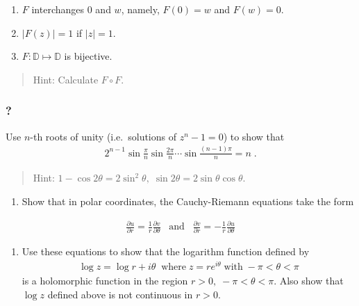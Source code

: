 \begin{enumerate}
\def\labelenumi{(\roman{enumi})}
\setcounter{enumi}{1}
\item
  \(F\) interchanges \(0\) and \(w\), namely, \(F(0) = w\) and
  \(F(w) = 0\).
\item
  \(|F(z)| = 1\) if \(|z| = 1\).
\item
  \(F: {\mathbb D} \mapsto {\mathbb D}\) is bijective.
\end{enumerate}

\begin{quote}
Hint: Calculate \(F \circ F\).
\end{quote}

\hypertarget{section-136}{%
\subsubsection{?}\label{section-136}}

Use \(n\)-th roots of unity (i.e.~solutions of \(z^n - 1 =0\)) to show
that
\begin{align*}2^{n-1} \sin\frac{\pi}{n} \sin\frac{2\pi}{n} \cdots \sin\frac{(n-1)\pi}{n}
= n
\; .\end{align*}

\begin{quote}
Hint:
\(1 - \cos 2 \theta = 2 \sin^2 \theta,\; \sin 2 \theta = 2 \sin \theta \cos \theta\).
\end{quote}

\begin{enumerate}
\def\labelenumi{(\alph{enumi})}
\tightlist
\item
  Show that in polar coordinates, the Cauchy-Riemann equations take the
  form
\end{enumerate}

\begin{align*}\frac{\partial u}{\partial r} = \frac{1}{r} \frac{\partial v}{\partial \theta}
\; \; \; \text{and} \; \; \;
\frac{\partial v}{\partial r} = - \frac{1}{r} \frac{\partial u}{\partial \theta}\end{align*}

\begin{enumerate}
\def\labelenumi{(\alph{enumi})}
\setcounter{enumi}{1}
\tightlist
\item
  Use these equations to show that the logarithm function defined by
  \begin{align*}\log z = \log r + i \theta \; \;
  \mbox{where} \; z = r e^{i \theta } \; \mbox{with} \; - \pi < \theta < \pi\end{align*}
  is a holomorphic function in the region
  \(r>0, \; - \pi < \theta < \pi\). Also show that \(\log z\) defined
  above is not continuous in \(r>0\).
\end{enumerate}

